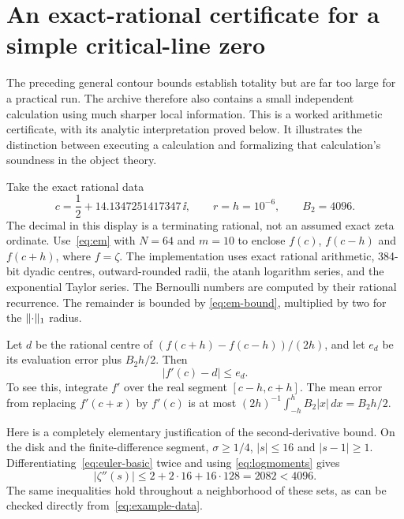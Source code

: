 \section{An exact-rational certificate for a simple critical-line zero}
\label{sec:example}

The preceding general contour bounds establish totality but are far too
large for a practical run. The archive therefore also contains a small
independent calculation using much sharper local information. This is a
worked arithmetic certificate, with its analytic interpretation proved
below. It illustrates the distinction between executing a calculation
and formalizing that calculation's soundness in the object theory.

Take the exact rational data
\begin{equation}
 c=\frac12+14.1347251417347\,\ii,
 \qquad r=h=10^{-6},\qquad B_2=4096.
 \label{eq:example-data}
\end{equation}
The decimal in this display is a terminating rational, not an assumed
exact zeta ordinate. Use~\eqref{eq:em} with $N=64$ and $m=10$ to
enclose $f(c)$, $f(c-h)$ and $f(c+h)$, where $f=\zeta$. The
implementation uses exact rational arithmetic, 384-bit dyadic centres,
outward-rounded radii, the atanh logarithm series, and the exponential
Taylor series. The Bernoulli numbers are computed by their rational
recurrence. The remainder is bounded by
\eqref{eq:em-bound}, multiplied by two for the $\lVert \cdot\rVert_1$ radius.

Let $d$ be the rational centre of
$(f(c+h)-f(c-h))/(2h)$, and let $e_d$ be its evaluation error plus
$B_2h/2$. Then
\begin{equation}
 |f'(c)-d|\le e_d.
 \label{eq:example-derivative}
\end{equation}
To see this, integrate $f'$ over the real segment $[c-h,c+h]$.
The mean error from replacing $f'(c+x)$ by $f'(c)$ is at most
$(2h)^{-1}\int_{-h}^h B_2|x|\,dx=B_2h/2$.

Here is a completely elementary justification of the second-derivative
bound. On the disk and the finite-difference segment,
$\sigma\ge1/4$, $|s|\le16$ and $|s-1|\ge1$.
Differentiating~\eqref{eq:euler-basic} twice and using
\eqref{eq:logmoments} gives
\[
 |\zeta''(s)|\le 2+2\cdot16+16\cdot128=2082<4096.
\]
The same inequalities hold throughout a neighborhood of these sets,
as can be checked directly from~\eqref{eq:example-data}.

